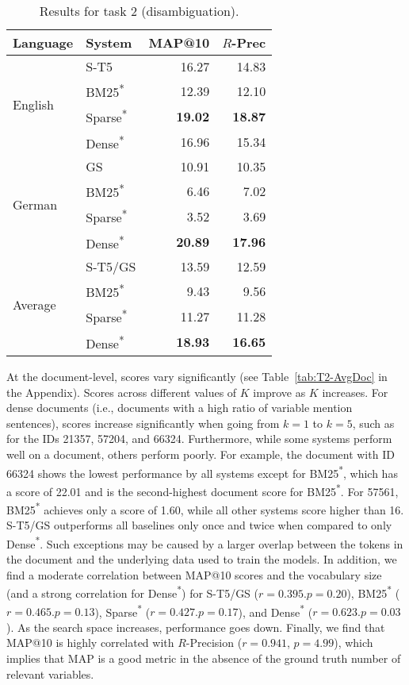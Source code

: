 \documentclass[11pt]{article}
\begin{document}
\begin{table}[]
    \centering
    \begin{tabular}{l|l|r|r}
    Language &  System &  MAP@10 &  $R$-Prec \\\hline
    \hline
      \multirow{4}{*}{English} &    S-T5 &    16.27 &   14.83 \\&    BM25\textsuperscript{*} &   12.39 &   12.10 \\&    Sparse\textsuperscript{*} &   \textbf{19.02} &   \textbf{18.87} \\&    Dense\textsuperscript{*} &   16.96 &   15.34 \\\hline
      \multirow{4}{*}{German} &    GS &   10.91 &   10.35 \\&    BM25\textsuperscript{*} &   6.46 &    7.02 \\&    Sparse\textsuperscript{*} &   3.52 &    3.69 \\&    Dense\textsuperscript{*} &  \textbf{20.89} &   \textbf{17.96} \\\hline
    \multirow{4}{*}{Average} &    S-T5/GS &   13.59 &   12.59 \\&    BM25\textsuperscript{*} &   9.43 &   9.56 \\&    Sparse\textsuperscript{*} &  11.27 &  11.28 \\&    Dense\textsuperscript{*} &  \textbf{18.93} &  \textbf{16.65} \\\hline
    \end{tabular}
    \caption{Results for task 2 (disambiguation).}
    \label{tab:T2-Avg}
\end{table}

At the document-level, scores vary significantly (see Table~\ref{tab:T2-AvgDoc} in the Appendix).
Scores across different values of $K$ improve as $K$ increases.
For dense documents (i.e., documents with a high ratio of variable mention sentences), scores increase significantly when going from $k=1$ to $k=5$, such as for the IDs 21357, 57204, and 66324.
Furthermore, while some systems perform well on a document, others perform poorly.
For example, the document with ID 66324 shows the lowest performance by all systems except for BM25\textsuperscript{*}, which has a score of 22.01 and is the second-highest document score for BM25\textsuperscript{*}.
For 57561, BM25\textsuperscript{*} achieves only a score of 1.60, while all other systems score higher than 16.
S-T5/GS outperforms all baselines only once and twice when compared to only Dense\textsuperscript{*}.
Such exceptions may be caused by a larger overlap between the tokens in the document and the underlying data used to train the models.
In addition, we find a moderate correlation between MAP@10 scores and the vocabulary size (and a strong correlation for Dense\textsuperscript{*}) for S-T5/GS ($r=0.395. p=0.20$), BM25\textsuperscript{*} ($r=0.465. p=0.13$), Sparse\textsuperscript{*} ($r=0.427. p=0.17$), and Dense\textsuperscript{*} ($r=0.623. p=0.03$).
As the search space increases, performance goes down.
Finally, we find that MAP@10 is highly correlated with $R$-Precision ($r=0.941$, $p=4.99$), which implies that MAP is a good metric in the absence of the ground truth number of relevant variables.
\end{document}
